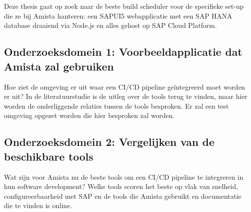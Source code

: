 
\chapter{}
\label{ch:methodologie}

Deze thesis gaat op zoek naar de beste build scheduler voor de specifieke set-up die ze bij Amista hanteren: een SAPUI5 webapplicatie met een SAP HANA database draaiend via Node.js en alles gehost op SAP Cloud Platform.



\section{Onderzoeksdomein 1: Voorbeeldapplicatie dat Amista zal gebruiken}
\label{sec:onderzoeksdeel1}
Hoe ziet de omgeving er uit waar een CI/CD pipeline geïntegreerd moet worden er uit? In de literatuurstudie is de uitleg over de tools terug te vinden, maar hier worden de onderliggende relaties tussen de tools besproken.
Er zal een test omgeving opgezet worden die hier besproken zal worden. 


\section{Onderzoeksdomein 2: Vergelijken van de beschikbare tools}
\label{sec:onderzoeksdeel2}
Wat zijn voor Amista nu de beste tools om een CI/CD pipeline te integreren in hun software development? Welke tools scoren het beste op vlak van snelheid, configureerbaarheid met SAP en de tools die Amista gebruikt en documentatie die te vinden is online.